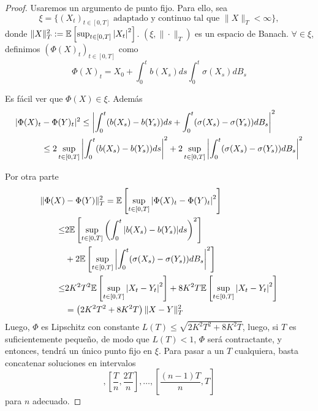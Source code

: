 \begin{proof}
\gris
Usaremos un argumento de punto fijo. Para ello, sea
\begin{equation*}
        \xi = \{ (X_t)_{t \in [0,T]} \text{ adaptado y continuo tal que }  \|X\|_T < \infty \},
\end{equation*}
donde $\|X\|_{T}^{2} := \mathbb{E} \left[ \sup_{t \in [0,T]} \abs{X_t}^{2}
\right] $. $(\xi, \| \cdot \|_{T})$ es un espacio de Banach. $\forall \in \xi$, definimos 
$(\Phi(X)_t)_{t \in [0,T]}$ como
\begin{equation*}
        \Phi(X)_t = X_0 + \int_{0}^{t} b(X_s) ds  \int_{0}^{t} \sigma(X_s) dB_s
\end{equation*}

Es fácil ver que $\Phi(X) \in \xi$. Además 
\begin{align*}
        | \Phi(X)_t & -  \Phi(Y)_{t}|^2 
        \le \abs{ \int_{0}^{t} (b(X_s) -b(Y_s))ds +
        \int_{0}^{t}(\sigma(X_s) - \sigma(Y_s)) dB_s}^2 \\
        &\le 2\sup_{t \in [0,T]} \abs{ \int_{0}^{t} (b(X_s) -b(Y_s))ds}^2
          + 2\sup_{t \in [0,T]} \abs{  \int_{0}^{t}(\sigma(X_s) - \sigma(Y_s)) dB_s}^2
\end{align*}

Por otra parte
\begin{align*}
        \|\Phi(X) &- \Phi(Y)\|_{T}^{2} = 
        \mathbb{E} \left[ \sup_{t \in [0,T]} \abs{\Phi(X)_{t} - \Phi(Y)_{t}}^2 \right] \\ 
        \le  & 2 \mathbb{E} \left[ \sup_{t \in [0,T]} \left( \int_{0}^{t}
        \abs{b(X_s) -b(Y_s)}ds \right)^2 \right] \\
         & + 2 \mathbb{E} \left[\sup_{t \in [0,T]} \abs{ \int_{0}^{t}
        (\sigma(X_s) -\sigma(Y_s))dB_s}^2 \right] \\
        \le & 2 K^2T^2\mathbb{E} \left[\sup_{t \in [0,T]} \abs{ X_t -Y_t }^2 \right] 
        + 8 K^2 T \mathbb{E} \left[ \sup_{t \in [0,T]} \abs{X_t - Y_t}^2\right] \\
        &= \left( 2K^2 T^2 + 8K^2 T \right) \| X-Y \|_{T}^{2}
\end{align*}
Luego, $\Phi$ es Lipschitz con constante $L(T) \le \sqrt{2 K^2 T^2 + 8 K^2 T}$, luego, si $T$ es 
suficientemente pequeño, de modo que $L(T)<1$, $\Phi$ será contractante, y entonces, tendrá un único
punto fijo en $\xi$. Para pasar a un $T$ cualquiera, basta concatenar soluciones en intervalos
\begin{equation*}
        [0,\frac{T}{n}], [\frac{T}{n}, \frac{2T}{n}], \ldots, [\frac{(n-1)T}{n},T]
\end{equation*}
para $n$ adecuado.\findem
\negro
\end{proof}

